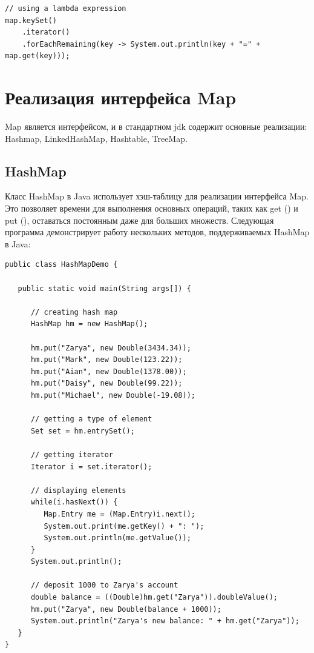 \begin{lstlisting}
// using a lambda expression
map.keySet()
    .iterator()
    .forEachRemaining(key -> System.out.println(key + "=" + map.get(key)));
\end{lstlisting}


\section{Реализация интерфейса Map}

Map является интерфейсом, и в стандартном jdk содержит основные реализации: Hashmap, LinkedHashMap, Hashtable, TreeMap. 

\subsection{HashMap}

Класс HashMap в Java использует хэш-таблицу для реализации интерфейса Map. Это позволяет времени для выполнения основных операций, таких как get () и put (), оставаться постоянным даже для больших множеств. Следующая программа демонстрирует работу нескольких методов, поддерживаемых HashMap в Java:

\begin{lstlisting}
public class HashMapDemo {

   public static void main(String args[]) {
   
      // creating hash map
      HashMap hm = new HashMap();
      
      hm.put("Zarya", new Double(3434.34));
      hm.put("Mark", new Double(123.22));
      hm.put("Aian", new Double(1378.00));
      hm.put("Daisy", new Double(99.22));
      hm.put("Michael", new Double(-19.08));
      
      // getting a type of element
      Set set = hm.entrySet();
      
      // getting iterator
      Iterator i = set.iterator();
      
      // displaying elements
      while(i.hasNext()) {
         Map.Entry me = (Map.Entry)i.next();
         System.out.print(me.getKey() + ": ");
         System.out.println(me.getValue());
      }
      System.out.println();
      
      // deposit 1000 to Zarya's account
      double balance = ((Double)hm.get("Zarya")).doubleValue();
      hm.put("Zarya", new Double(balance + 1000));
      System.out.println("Zarya's new balance: " + hm.get("Zarya"));
   }
}
\end{lstlisting}

